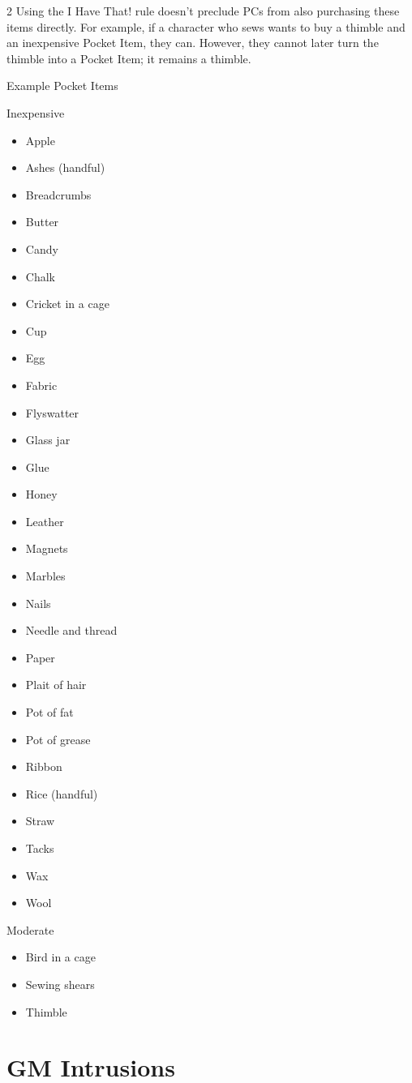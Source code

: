 \begin{multicols}{2}
Using the I Have That! rule doesn’t preclude PCs from also purchasing these items directly. For example, if a character who sews wants to buy a thimble and an inexpensive Pocket Item, they can. However, they cannot later turn the thimble into a Pocket Item; it remains a thimble.

Example Pocket Items

Inexpensive
\begin{itemize}
\item Apple
\item Ashes (handful)
\item Breadcrumbs
\item Butter
\item Candy
\item Chalk
\item Cricket in a cage
\item Cup
\item Egg
\item Fabric
\item Flyswatter
\item Glass jar
\item Glue
\item Honey
\item Leather
\item Magnets
\item Marbles
\item Nails
\item Needle and thread
\item Paper
\item Plait of hair
\item Pot of fat
\item Pot of grease 
\item Ribbon
\item Rice (handful) 
\item Straw
\item Tacks
\item Wax
\item Wool
\end{itemize}

Moderate
\begin{itemize}
\item Bird in a cage 
\item Sewing shears
\item Thimble
\end{itemize}

\section{GM Intrusions}


\end{multicols}
